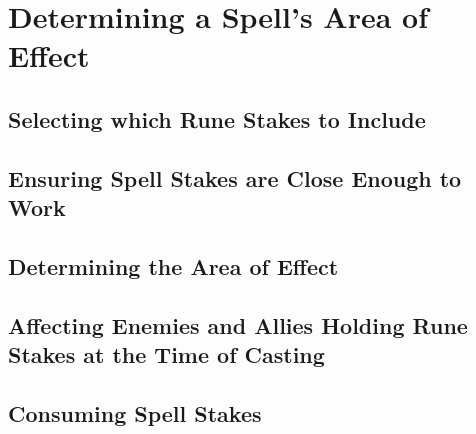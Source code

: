 \section{Determining a Spell's Area of Effect}

\subsection{Selecting which Rune Stakes to Include}

\subsection{Ensuring Spell Stakes are Close Enough to Work}

\subsection{Determining the Area of Effect}

\subsection{Affecting Enemies and Allies Holding Rune Stakes at the Time of Casting}

\subsection{Consuming Spell Stakes}
